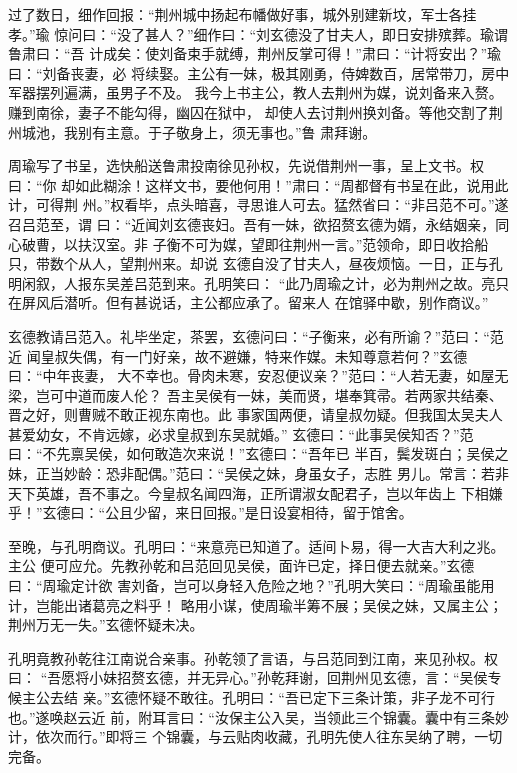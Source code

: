 过了数日，细作回报：“荆州城中扬起布幡做好事，城外别建新坟，军士各挂孝。”瑜
惊问曰：“没了甚人？”细作曰：“刘玄德没了甘夫人，即日安排殡葬。瑜谓鲁肃曰：“吾
计成矣：使刘备束手就缚，荆州反掌可得！”肃曰：“计将安出？”瑜曰：“刘备丧妻，必
将续娶。主公有一妹，极其刚勇，侍婢数百，居常带刀，房中军器摆列遍满，虽男子不及。
我今上书主公，教人去荆州为媒，说刘备来入赘。赚到南徐，妻子不能勾得，幽囚在狱中，
却使人去讨荆州换刘备。等他交割了荆州城池，我别有主意。于子敬身上，须无事也。”鲁
肃拜谢。

周瑜写了书呈，选快船送鲁肃投南徐见孙权，先说借荆州一事，呈上文书。权曰：“你
却如此糊涂！这样文书，要他何用！”肃曰：“周都督有书呈在此，说用此计，可得荆
州。”权看毕，点头暗喜，寻思谁人可去。猛然省曰：“非吕范不可。”遂召吕范至，谓
曰：“近闻刘玄德丧妇。吾有一妹，欲招赘玄德为婿，永结姻亲，同心破曹，以扶汉室。非
子衡不可为媒，望即往荆州一言。”范领命，即日收拾船只，带数个从人，望荆州来。却说
玄德自没了甘夫人，昼夜烦恼。一日，正与孔明闲叙，人报东吴差吕范到来。孔明笑曰：
“此乃周瑜之计，必为荆州之故。亮只在屏风后潜听。但有甚说话，主公都应承了。留来人
在馆驿中歇，别作商议。”

玄德教请吕范入。礼毕坐定，茶罢，玄德问曰：“子衡来，必有所谕？”范曰：“范近
闻皇叔失偶，有一门好亲，故不避嫌，特来作媒。未知尊意若何？”玄德曰：“中年丧妻，
大不幸也。骨肉未寒，安忍便议亲？”范曰：“人若无妻，如屋无梁，岂可中道而废人伦？
吾主吴侯有一妹，美而贤，堪奉箕帚。若两家共结秦、晋之好，则曹贼不敢正视东南也。此
事家国两便，请皇叔勿疑。但我国太吴夫人甚爱幼女，不肯远嫁，必求皇叔到东吴就婚。”
玄德曰：“此事吴侯知否？”范曰：“不先禀吴侯，如何敢造次来说！”玄德曰：“吾年已
半百，鬓发斑白；吴侯之妹，正当妙龄：恐非配偶。”范曰：“吴侯之妹，身虽女子，志胜
男儿。常言：若非天下英雄，吾不事之。今皇叔名闻四海，正所谓淑女配君子，岂以年齿上
下相嫌乎！”玄德曰：“公且少留，来日回报。”是日设宴相待，留于馆舍。

至晚，与孔明商议。孔明曰：“来意亮已知道了。适间卜易，得一大吉大利之兆。主公
便可应允。先教孙乾和吕范回见吴侯，面许已定，择日便去就亲。”玄德曰：“周瑜定计欲
害刘备，岂可以身轻入危险之地？”孔明大笑曰：“周瑜虽能用计，岂能出诸葛亮之料乎！
略用小谋，使周瑜半筹不展；吴侯之妹，又属主公；荆州万无一失。”玄德怀疑未决。

孔明竟教孙乾往江南说合亲事。孙乾领了言语，与吕范同到江南，来见孙权。权曰：
“吾愿将小妹招赘玄德，并无异心。”孙乾拜谢，回荆州见玄德，言：“吴侯专候主公去结
亲。”玄德怀疑不敢往。孔明曰：“吾已定下三条计策，非子龙不可行也。”遂唤赵云近
前，附耳言曰：“汝保主公入吴，当领此三个锦囊。囊中有三条妙计，依次而行。”即将三
个锦囊，与云贴肉收藏，孔明先使人往东吴纳了聘，一切完备。

